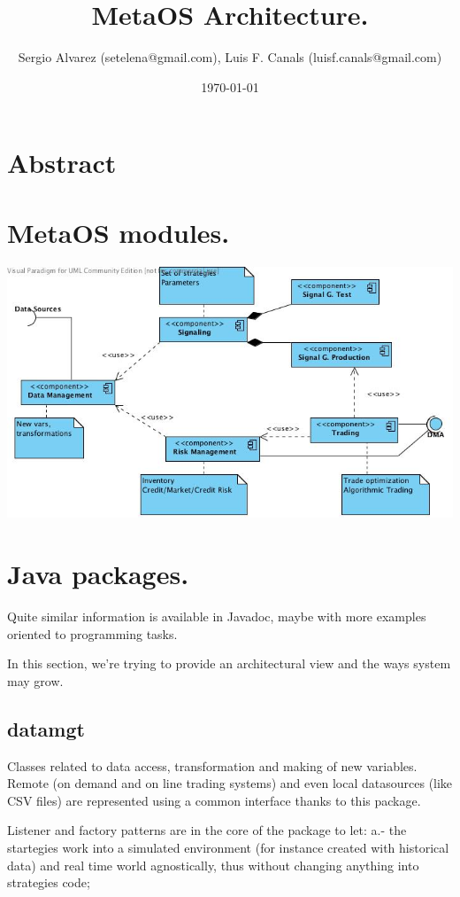 \documentclass[11pt,a4paper]{article}
\title{MetaOS Architecture.}
\author{Sergio Alvarez (setelena@gmail.com),
    Luis F. Canals (luisf.canals@gmail.com)}
\begin{document}
\date{\today}
\maketitle


\section{Abstract}

\section{MetaOS modules.}

\includegraphics{images/Overview.jpg}

\section{Java packages.}
Quite similar information is available in Javadoc, maybe with more 
examples oriented to programming tasks.

In this section, we're trying to provide an architectural view 
and the ways system may grow.


\subsection{datamgt}
Classes related to data access, transformation and making of new variables.
Remote (on demand and on line trading systems) and even local datasources 
(like CSV files) are represented using a common interface thanks to 
this package.

Listener and factory patterns are in the core of the package to let:
    a.- the startegies work into a simulated environment (for instance
        created with historical data) and real time world agnostically,
        thus without changing anything into strategies code;
\end{document}
